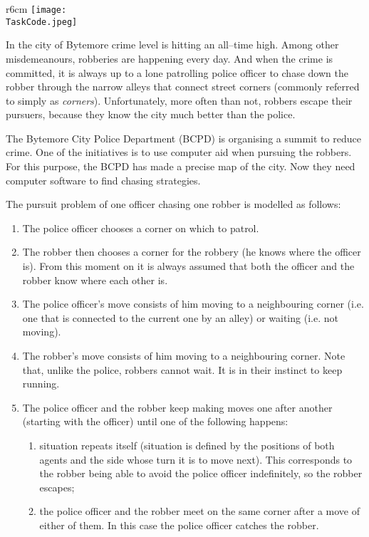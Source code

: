 \documentclass{boi2014}
\renewcommand{\TaskCode}{coprobber}
\begin{document}
    \begin{wrapfigure}[8]{r}{6cm}
        \vspace{-24pt}
		\texttt{[image: \\TaskCode.jpeg]}
	\end{wrapfigure}

    In the city of Bytemore crime level is hitting an all--time high.
    Among other misdemeanours, robberies are happening every day.
    And when the crime is committed, it is always up to a lone patrolling
    police officer to chase down the robber through the narrow alleys
    that connect street corners (commonly referred to simply as
    \emph{corners}). Unfortunately, more often than not, robbers escape
    their pursuers, because they know the city much better than
    the police.

    The Bytemore City Police Department (BCPD) is organising a summit
    to reduce crime. One of the initiatives is to use computer aid when
    pursuing the robbers. For this purpose, the BCPD has made a precise
    map of the city. Now they need computer software to find chasing
    strategies.

    The pursuit problem of one officer chasing one robber is modelled
    as follows:
    \begin{enumerate}
        \item The police officer chooses a corner on which to patrol.
        \item The robber then chooses a corner for the robbery
            (he knows where the officer is). From this moment on it
            is always assumed that both the officer and the robber
            know where each other is.
        \item The police officer's move consists of him moving to a
            neighbouring corner (i.e. one that is connected to the
            current one by an alley) or waiting (i.e. not moving).
        \item The robber's move consists of him moving to a neighbouring
            corner. Note that, unlike the police, robbers cannot wait.
            It is in their instinct to keep running.
        \item The police officer and the robber keep making moves one after
        another (starting with the officer) until one of the following
        happens:
        \begin{enumerate}
            \item situation repeats itself (situation is defined
                by the positions of both agents and the side whose turn
                it is to move next). This corresponds to the robber being
                able to avoid the police officer indefinitely, so the
                robber escapes;
            \item the police officer and the robber meet on the same corner
                after a move of either of them. In this case the police officer
                catches the robber.
        \end{enumerate}
    \end{enumerate}
\end{document}
